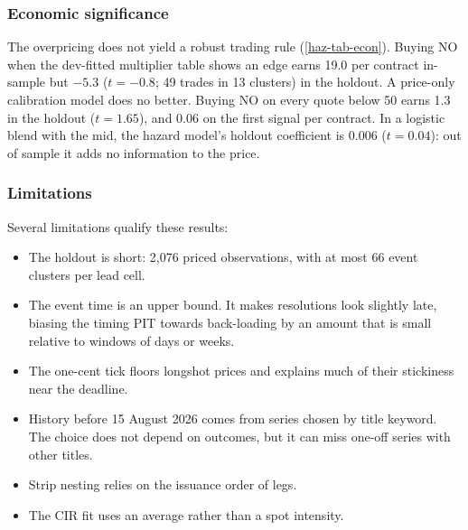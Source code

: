 \subsubsection{Economic significance}\label{haz-res-econ}

The overpricing does not yield a robust trading rule (\cref{haz-tab-econ}). Buying NO when the
dev-fitted multiplier table shows an edge earns 19.0\cents{} per contract in-sample but $-5.3$\cents{}
($t=-0.8$; 49 trades in 13 clusters) in the holdout. A price-only calibration model does no better.
Buying NO on every quote below 50\cents{} earns 1.3\cents{} in the holdout ($t=1.65$), and 0.06\cents{}
on the first signal per contract. In a logistic blend with the mid, the hazard model's holdout
coefficient is 0.006 ($t=0.04$): out of sample it adds no information to the price.

\subsubsection{Limitations}\label{haz-res-limits}
Several limitations qualify these results:
\begin{itemize}
\item The holdout is short: 2{,}076 priced observations, with at most 66 event clusters per lead cell.
\item The event time is an upper bound. It makes resolutions look slightly late, biasing the timing
  PIT towards back-loading by an amount that is small relative to windows of days or weeks.
\item The one-cent tick floors longshot prices and explains much of their stickiness near the
  deadline.
\item History before 15 August 2026 comes from series chosen by title keyword. The choice does not
  depend on outcomes, but it can miss one-off series with other titles.
\item Strip nesting relies on the issuance order of legs.
\item The CIR fit uses an average rather than a spot intensity.
\end{itemize}
